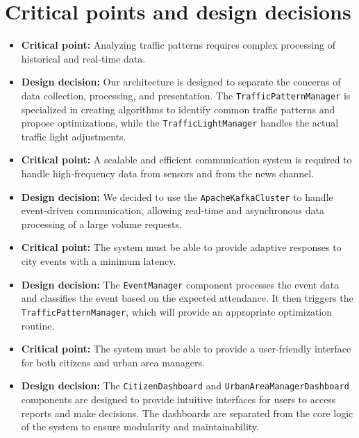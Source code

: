 \documentclass[12pt, a4paper, twoside, openright]{report}
\begin{document}
\section{Critical points and design decisions}
  \begin{itemize}
    \item \textbf{Critical point:} Analyzing traffic patterns requires complex processing of historical and real-time data.
    \item \textbf{Design decision:} Our architecture is designed to separate the
      concerns of data collection, processing, and presentation. The
      \texttt{TrafficPatternManager} is specialized in creating algorithms to identify
      common traffic patterns and propose optimizations, while the
      \texttt{TrafficLightManager} handles the actual traffic light adjustments. \\
    
    \item \textbf{Critical point:} A scalable and efficient communication system is required to handle high-frequency data from sensors and from the news channel. 
    \item \textbf{Design decision:} We decided to use the \texttt{ApacheKafkaCluster} to handle event-driven communication,
      allowing real-time and asynchronous data processing of a large volume requests. \\
      
    \item \textbf{Critical point:} The system must be able to provide adaptive responses to city events with a minimum latency.
    \item \textbf{Design decision:} The \texttt{EventManager} component processes the event data and
      classifies the event based on the expected attendance. It then triggers the \texttt{TrafficPatternManager},
      which will provide an appropriate optimization routine. \\
    
    \item \textbf{Critical point:} The system must be able to provide a user-friendly interface for both citizens and urban area managers.
    \item \textbf{Design decision:} The \texttt{CitizenDashboard} and \texttt{UrbanAreaManagerDashboard} components are designed to provide
      intuitive interfaces for users to access reports and make decisions. The dashboards are
      separated from the core logic of the system to ensure modularity and maintainability. \\
    

\end{itemize}
\end{document}
